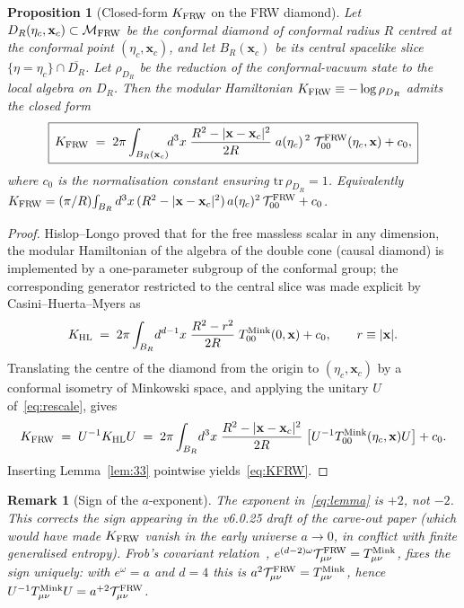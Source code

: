 \documentclass[11pt]{article}
\newtheorem{proposition}[lemma]{Proposition}
\newtheorem{remark}[lemma]{Remark}
\begin{document}
\begin{proposition}[Closed-form $K_{\rm FRW}$ on the FRW diamond]\label{prop:K}
Let $D_R(\eta_c,\mathbf{x}_c)\subset\mathcal{M}_{\rm FRW}$ be the
conformal diamond of conformal radius $R$ centred at the conformal point
$(\eta_c,\mathbf{x}_c)$, and let $B_R(\mathbf{x}_c)$ be its central
spacelike slice $\{\eta=\eta_c\}\cap\overline{D_R}$.  Let $\rho_{D_R}$ be
the reduction of the conformal-vacuum state to the local algebra on
$D_R$.  Then the modular Hamiltonian $K_{\rm FRW}\equiv -\log\rho_{D_R}$
admits the closed form
\begin{equation}
\boxed{\,
   K_{\rm FRW}
   \;=\;
   2\pi\int_{B_R(\mathbf{x}_c)}\!\!d^3 x\;
        \frac{R^2-|\mathbf{x}-\mathbf{x}_c|^2}{2R}\;
        a(\eta_c)^{\,2}\;\mathcal{T}^{\rm FRW}_{00}(\eta_c,\mathbf{x})
   + c_0,
\,}
   \label{eq:KFRW}
\end{equation}
where $c_0$ is the normalisation constant ensuring $\mathrm{tr}\,\rho_{D_R}=1$.
Equivalently
$K_{\rm FRW}=(\pi/R)\!\int_{B_R}d^3x\,(R^2-|\mathbf{x}-\mathbf{x}_c|^2)\,a(\eta_c)^2\,\mathcal{T}^{\rm FRW}_{00}+c_0$.
\end{proposition}

\begin{proof}
Hislop--Longo \cite{HislopLongo1982} proved that for the free massless
scalar in any dimension, the modular Hamiltonian of the algebra of the
double cone (causal diamond) is implemented by a one-parameter subgroup of
the conformal group; the corresponding generator restricted to the central
slice was made explicit by Casini--Huerta--Myers
\cite[eq.~(2.20)]{CasiniHuertaMyers2011} as
\begin{equation}
   K_{\rm HL}
   \;=\;
   2\pi\int_{B_R}\!d^{d-1}x\;
        \frac{R^2-r^2}{2R}\;T^{\rm Mink}_{00}(0,\mathbf{x})
   + c_0,
   \qquad r\equiv|\mathbf{x}|.
   \label{eq:HL}
\end{equation}
Translating the centre of the diamond from the origin to $(\eta_c,
\mathbf{x}_c)$ by a conformal isometry of Minkowski space, and applying
the unitary $U$ of~\eqref{eq:rescale}, gives
\[
   K_{\rm FRW}\;=\;U^{-1}K_{\rm HL}U
   \;=\;
   2\pi\int_{B_R}\!d^3x\;\frac{R^2-|\mathbf{x}-\mathbf{x}_c|^2}{2R}\;
       \bigl[U^{-1}T^{\rm Mink}_{00}(\eta_c,\mathbf{x})U\bigr] + c_0.
\]
Inserting Lemma~\ref{lem:33} pointwise yields~\eqref{eq:KFRW}.
\end{proof}

\begin{remark}[Sign of the $a$-exponent]\label{rem:sign}
The exponent in~\eqref{eq:lemma} is $+2$, not $-2$.  This corrects the sign
appearing in the v6.0.25 draft of the carve-out paper (which would have
made $K_{\rm FRW}$ vanish in the early universe $a\to 0$, in conflict
with finite generalised entropy).  Frob's covariant
relation~\cite[eq.~(3.8)]{Frob2023}, $e^{(d-2)\omega}\mathcal{T}^{\rm FRW}_{\mu\nu}=T^{\rm Mink}_{\mu\nu}$,
fixes the sign uniquely: with $e^\omega=a$ and $d=4$ this is
$a^{2}\mathcal{T}^{\rm FRW}_{\mu\nu}=T^{\rm Mink}_{\mu\nu}$, hence
$U^{-1}T^{\rm Mink}_{\mu\nu}U=a^{+2}\mathcal{T}^{\rm FRW}_{\mu\nu}$.
\end{remark}
\end{document}
